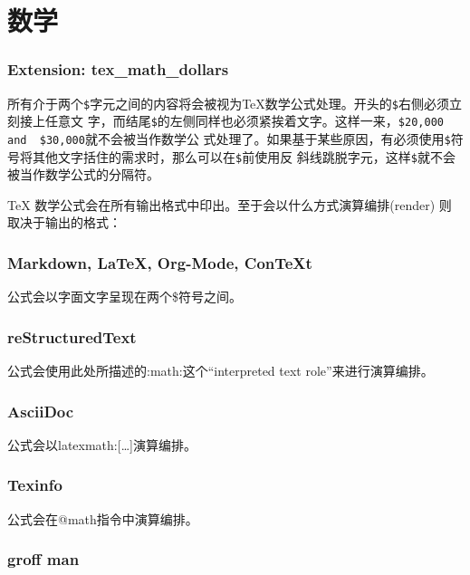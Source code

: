 \documentclass[fancyhdr,bookmark]{ctexbook}
\begin{document}
\section{数学}\label{ux6570ux5b66}

\subsubsection{Extension:
tex\_math\_dollars}\label{extension-tex_math_dollars}

所有介于两个\lstinline!$!字元之间的内容将会被视为TeX数学公式处理。开头的\lstinline!$!右侧必须立刻接上任意文
字，而结尾\lstinline!$!的左侧同样也必须紧挨着文字。这样一来，\lstinline!$20,000  and  $30,000!就不会被当作数学公
式处理了。如果基于某些原因，有必须使用\lstinline!$!符号将其他文字括住的需求时，那么可以在\lstinline!$!前使用反
斜线跳脱字元，这样\lstinline!$!就不会被当作数学公式的分隔符。

TeX 数学公式会在所有输出格式中印出。至于会以什么方式演算编排(render)
则取决于输出的格式：

\subsubsection{Markdown, LaTeX, Org-Mode,
ConTeXt}\label{markdown-latex-org-mode-context}

公式会以字面文字呈现在两个\$符号之间。

\subsubsection{reStructuredText}\label{restructuredtext}

公式会使用此处所描述的:math:这个``interpreted text
role''来进行演算编排。

\subsubsection{AsciiDoc}\label{asciidoc}

公式会以latexmath:{[}\ldots{}{]}演算编排。

\subsubsection{Texinfo}\label{texinfo}

公式会在@math指令中演算编排。

\subsubsection{groff man}\label{groff-man}
\end{document}
